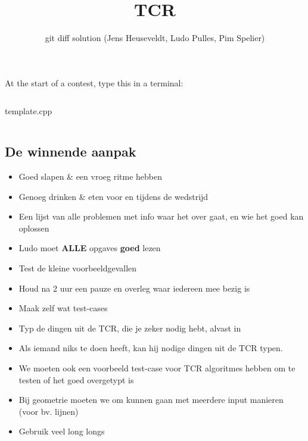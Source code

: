 \documentclass[8pt,a4paper,landscape,oneside]{amsart}
\title{TCR}
\subtitle{git diff solution (Jens Heuseveldt, Ludo Pulles, Pim Spelier)}
\newcommand{\code}[1]{\inputminted[fontsize=\normalsize,baselinestretch=1,breaklines,tabsize=2]{cpp}{code/#1}}
\begin{document}
\begin{multicols*}{3}
\maketitle
\begin{comment}
\begin{center}
	\makeatletter
	\textbf{\@title} \\
	\emph{\@author}
	\makeatother
\end{center}
\end{comment}

\tableofcontents

\begin{center}
At the start of a contest, type this in a terminal:
\end{center}

% 
\inputminted[fontsize=\normalsize,baselinestretch=1,breaklines,linenos,tabsize=2]{bash}{code/start.sh}

\begin{center}
template.cpp
\end{center}

\code{T.cpp}

\subsection{De winnende aanpak}

\begin{itemize}
	\setlength\itemsep{-.25em}
	\item Goed slapen \& een vroeg ritme hebben
	\item Genoeg drinken \& eten voor en tijdens de wedstrijd
	\item Een lijst van alle problemen met info waar het over gaat, en wie het goed kan oplossen
	\item Ludo moet {\huge\textbf{ALLE}} opgaves \textbf{goed} lezen
	\item Test de kleine voorbeeldgevallen
	\item Houd na 2 uur een pauze en overleg waar iedereen mee bezig is
	\item Maak zelf wat test-cases
	\item Typ de dingen uit de TCR, die je zeker nodig hebt, alvast in
	\item Als iemand niks te doen heeft, kan hij nodige dingen uit de TCR typen.
	\item We moeten ook een voorbeeld test-case voor TCR algoritmes hebben om te testen of het goed overgetypt is
	\item Bij geometrie moeten we om kunnen gaan met meerdere input manieren (voor bv. lijnen)
	\item Gebruik veel long long\textquotesingle s
\end{itemize}


\end{multicols*}
\end{document}
